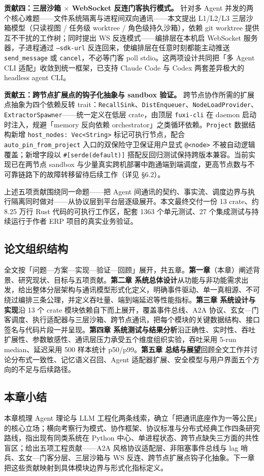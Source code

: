 \textbf{贡献四：三层沙箱 \texorpdfstring{$\times$}{x} WebSocket 反连门客执行模式。} 针对多 Agent 并发的两个核心难题——文件系统隔离与进程间双向通讯——本文提出 L1/L2/L3 三层沙箱模型（只读视图 / 任务级 worktree / 角色级持久沙箱），依赖 git worktree\parencite{git2024worktree} 提供互不干扰的工作树；同时提出 WS 反连模式——编排层在本机启 WebSocket 服务器，子进程通过 \texttt{--sdk-url} 反连回来，使编排层在任意时刻都能主动推送 \texttt{send\_message} 或 \texttt{cancel}，不必等门客 poll stdio。这两项设计共同把「多 Agent CLI 适配」收敛到统一框架，已支持 Claude Code 与 Codex 两套差异极大的 headless agent CLI。

\textbf{贡献五：跨节点扩展点的钩子化抽象与 sandbox 验证。} 跨节点协作所需的扩展点抽象为四个依赖反转 trait：\texttt{RecallSink}、\texttt{DistEnqueuer}、\texttt{NodeLoadProvider}、\texttt{ExtractorSpawner}——统一定义在低层 crate，由顶层 \texttt{fuxi-cli} 在 daemon 启动时注入，规避「memory 反向依赖 orchestrator」之类循环依赖。\texttt{Project} 数据结构新增 \texttt{host\_nodes: Vec<String>} 标记可执行节点，配合 \texttt{auto\_pin\_from\_project} 入口的双保险守卫保证用户显式 \texttt{@<node>} 不被自动逻辑覆盖；新增字段以 \texttt{\#[serde(default)]} 搭配反回归测试保持跨版本兼容。当前实现已在两节点 sandbox 与少量真实跨机部署中跑通端到端调度，更高节点数与不可靠链路下的故障转移留待后续工作（详见 §6.2）。

上述五项贡献围绕同一命题——把 Agent 间通讯的契约、事实流、调度边界与执行隔离同时做对——从协议层到平台层逐级展开。本文最终交付一份 13 crate、约 8.25 万行 Rust 代码的可执行工作区，配套 1363 个单元测试、27 个集成测试与持续运行于作者 ERP 项目的真实业务验证。

\subsection{论文组织结构}

全文按「问题—方案—实现—验证—回顾」展开，共五章。\textbf{第一章}（本章）阐述背景、研究现状、目标与五项贡献。\textbf{第二章 系统总体设计}从功能与非功能需求出发，给出整体分层架构与通讯模型形式化定义，明确事件驱动、单一真相源、不可绕过编排三条公理，并定义吞吐量、端到端延迟等性能指标。\textbf{第三章 系统设计与实现}沿 13 个 crate 模块依赖自下而上展开，覆盖事件总线、A2A 协议、玄女—门客调度、执行适配器与三层沙箱、跨节点通讯，把每个模块的关键数据结构、接口签名与代码片段一并呈现。\textbf{第四章 系统测试与结果分析}沿正确性、实时性、吞吐扩展性、参数敏感性、通讯层压力承受五个维度组织实验，吞吐采用 5-run median、延迟采用 500 样本统计 p50/p99。\textbf{第五章 总结与展望}回顾全文工作并讨论分布式一致性、记忆语义召回、Agent 适配器扩展、安全模型与用户界面五个方向的不足与后续路径。

\subsection{本章小结}

本章梳理 Agent 理论与 LLM 工程化两条线索，确立「把通讯底座作为一等公民」的核心立场；横向考察行为模式、协作框架、协议标准与分布式经典工作四条研究路线，指出现有同类系统在 Python 中心、单进程状态、跨节点缺失三方面的共性盲区；给出五项工程贡献——A2A 风格协议适配层、非阻塞事件总线与 lag 哨兵、玄女—门客分层、三层沙箱与 WS 反连、跨节点扩展点钩子化抽象。下一章把这些贡献映射到具体模块边界与形式化指标定义。
